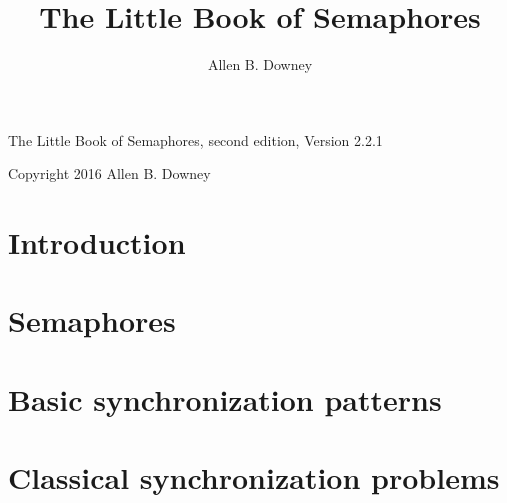 \documentclass{book}
\title{The Little Book of Semaphores}
\author{Allen B. Downey}
\newcommand{\theversion}{Version 2.2.1}
\newcommand{\clearemptydoublepage}{\newpage\cleardoublepage}
\newif\ifnotcompact
\begin{document}
\maketitle

\ifnotcompact
\frontmatter

\chapter{Preface}



\else
\null
\fi

\vfill

\begin{center}
The Little Book of Semaphores, second edition, \theversion
\vspace{0.25in}

Copyright 2016 Allen B. Downey
\end{center}
\vspace{0.25in}



\ifnotcompact
\else
\frontmatter
\fi

\tableofcontents
\clearemptydoublepage

\mainmatter


\chapter{Introduction}



\chapter{Semaphores}



\chapter{Basic synchronization patterns}



\clearemptydoublepage
\chapter{Classical synchronization problems}



\clearemptydoublepage
\end{document}
